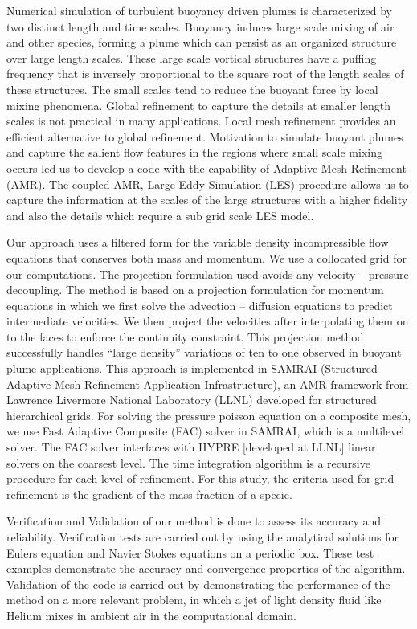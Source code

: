 \documentclass[twosided]{report}
\begin{document}
Numerical simulation of turbulent buoyancy driven plumes is
characterized by two distinct length and time scales. Buoyancy induces
large scale mixing of air and other species, forming a plume which can
persist as an organized structure over large length scales. These large
scale vortical structures have a puffing frequency that is inversely
proportional to the square root of the length scales of these
structures. The small scales tend to reduce the buoyant force by local
mixing phenomena. Global refinement to capture the details at smaller
length scales is not practical in many applications. Local mesh
refinement provides an efficient alternative to global refinement.
Motivation to simulate buoyant plumes and capture the salient flow
features in the regions where small scale mixing occurs led us to
develop a code with the capability of Adaptive Mesh Refinement (AMR).
The coupled AMR, Large Eddy Simulation (LES) procedure allows us to
capture the information at the scales of the large structures with a
higher fidelity and also the details which require a sub grid scale LES
model.

Our approach uses a filtered form for the variable density
incompressible flow equations that conserves both mass and momentum. We
use a collocated grid for our computations. The projection formulation
used avoids any velocity – pressure decoupling. The method
is based on a projection formulation for momentum equations in which we
first solve the advection – diffusion equations to predict
intermediate velocities. We then project the velocities after
interpolating them on to the faces to enforce the continuity
constraint. This projection method successfully handles
``large density'' variations of ten to one observed
in buoyant plume applications. This approach is implemented in SAMRAI
(Structured Adaptive Mesh Refinement Application Infrastructure), an
AMR framework from Lawrence Livermore National Laboratory (LLNL)
developed for structured hierarchical grids. For solving the pressure
poisson equation on a composite mesh, we use Fast Adaptive Composite
(FAC) solver in SAMRAI, which is a multilevel solver. The FAC solver
interfaces with HYPRE [developed at LLNL] linear solvers on the
coarsest level. The time integration algorithm is a recursive procedure
for each level of refinement. For this study, the criteria used for
grid refinement is the gradient of the mass fraction of a specie.

Verification and Validation of our method is done to assess its
accuracy and reliability. Verification tests are carried out by using
the analytical solutions for Eulers equation and Navier Stokes
equations on a periodic box. These test examples demonstrate the
accuracy and convergence properties of the algorithm. Validation of the
code is carried out by demonstrating the performance of the method on a
more relevant problem, in which a jet of light density fluid like
Helium mixes in ambient air in the computational domain.
\end{document}

